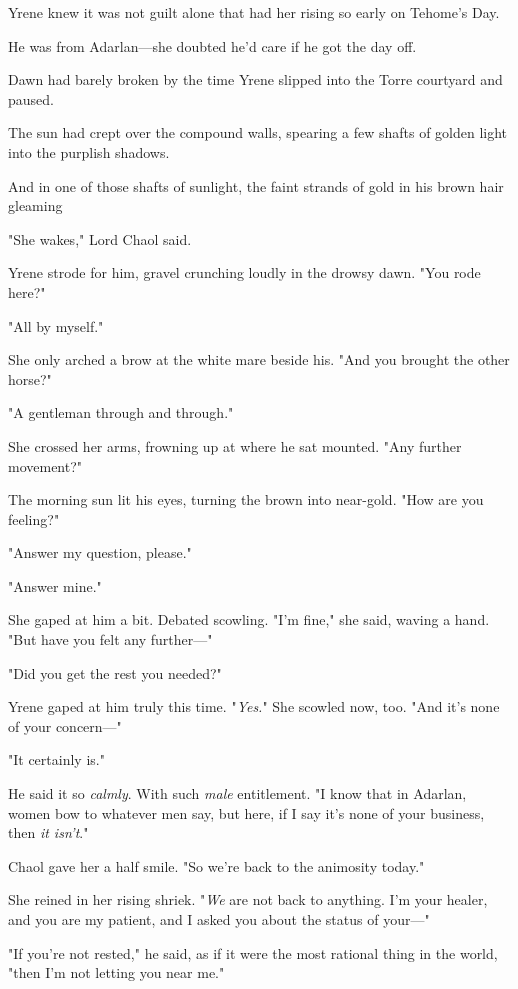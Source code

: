 Yrene knew it was not guilt alone that had her rising so early on Tehome's Day.

He was from Adarlan---she doubted he'd care if he got the day off.

Dawn had barely broken by the time Yrene slipped into the Torre courtyard and paused.

The sun had crept over the compound walls, spearing a few shafts of golden light into the purplish shadows.

And in one of those shafts of sunlight, the faint strands of gold in his brown hair gleaming 

"She wakes," Lord Chaol said.

Yrene strode for him, gravel crunching loudly in the drowsy dawn. "You rode here?"

"All by myself."

She only arched a brow at the white mare beside his. "And you brought the other horse?"

"A gentleman through and through."

She crossed her arms, frowning up at where he sat mounted. "Any further movement?"

The morning sun lit his eyes, turning the brown into near-gold. "How are you feeling?"

"Answer my question, please."

"Answer mine."

She gaped at him a bit. Debated scowling. "I'm fine," she said, waving a hand. "But have you felt any further---"

"Did you get the rest you needed?"

Yrene gaped at him truly this time. "\emph{Yes.}" She scowled now, too. "And it's none of your concern---"

"It certainly is."

He said it so \emph{calmly}. With such \emph{male} entitlement. "I know that in Adarlan, women bow to whatever men say, but here, if I say it's none of your business, then \emph{it isn't}."

Chaol gave her a half smile. "So we're back to the animosity today."

She reined in her rising shriek. "\emph{We} are not back to anything. I'm your healer, and you are my patient, and I asked you about the status of your---"

"If you're not rested," he said, as if it were the most rational thing in the world, "then I'm not letting you near me."

